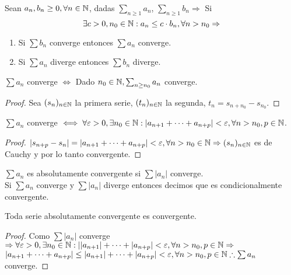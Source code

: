 \begin{corollary}
  Sean $a_n, b_n \geq 0, \forall n \in \mathbb{N}$, dadas $\sum_{n \geq 1} a_n$, $\sum_{n \geq 1} b_n \Rightarrow$ Si \begin{equation}
    \exists c > 0, n_0 \in \mathbb{N} : a_n \leq c \cdot b_n, \forall n > n_0 \Rightarrow 
  \end{equation}
  \begin{enumerate}
    \item Si $\sum b_n$ converge entonces $\sum a_n$ converge.
    \item Si $\sum a_n$ diverge entonces $\sum b_n$ diverge.
  \end{enumerate}

  \begin{note}
    $\sum a_n$ converge $\iff$ Dado $n_0 \in \mathbb{N}, \sum_{n \geq n_0} a_n$ converge.
  \end{note}
  \begin{proof}
    Sea $(s_n)_{n \in \mathbb{N}}$ la primera serie, $(t_n)_{n \in \mathbb{N}}$ la segunda, $t_n = s_{n + n_0} - s_{n_0}$.
  \end{proof}
\end{corollary}

\begin{theorem}
  $\sum a_n$ converge $\iff \forall \varepsilon > 0, \exists n_0 \in \mathbb{N} : | a_{n+1} + \cdots + a_{n+p} | < \varepsilon, \forall n > n_0, p \in \mathbb{N}$.
  \begin{proof}
    $|s_{n+p} - s_n| = |a_{n+1} + \cdots + a_{n+p}| < \varepsilon, \forall n > n_0 \in \mathbb{N} \Rightarrow (s_n)_{n \in \mathbb{N}}$ es de Cauchy y por lo tanto convergente.
  \end{proof}
\end{theorem}

\begin{definition}
  $\sum a_n$ es absolutamente convergente si $\sum |a_n|$ converge. \\
  Si $\sum a_n$ converge y $\sum |a_n|$ diverge entonces decimos que es condicionalmente convergente.
\end{definition}

\begin{theorem}
  Toda serie absolutamente convergente es convergente.
  \begin{proof}
    Como $\sum |a_n|$ converge $\Rightarrow \forall \varepsilon > 0, \exists n_0 \in \mathbb{N} : | |a_{n+1}| + \cdots + |a_{n+p}| < \varepsilon, \forall n > n_0, p \in \mathbb{N} \Rightarrow$ \\
    $|a_{n+1} + \cdots + a_{n+p}| \leq |a_{n+1}| + \cdots + |a_{n+p}| < \varepsilon, \forall n > n_0, p \in \mathbb{N} \therefore \sum a_n$ converge.
  \end{proof}
\end{theorem}
